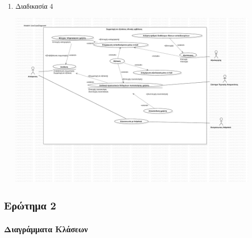 \documentclass[a4paper, titlepage, twoside]{article}
\begin{document}
\begin{enumerate}
\begin{center}
\end{center}
\item Διαδικασία 4
\label{sec:org3064bc6}
\begin{center}
\includegraphics[width=.9\linewidth]{use-case_4.pdf}
\end{center}
\end{enumerate}

\subsection{Ερώτημα 2}
\label{sec:org61b4db5}

\subsubsection{Διαγράμματα Κλάσεων}
\label{sec:org3673136}
\end{document}
